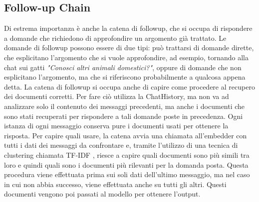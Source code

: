 \subsection{Follow-up Chain}
Di estrema importanza è anche la catena di followup, che si occupa di rispondere a domande che richiedono di approfondire un argomento già trattato. Le domande di followup possono essere di due tipi: può trattarsi di domande dirette, che esplicitano l'argomento che si vuole approfondire, ad esempio, tornando alla chat sui gatti \textit{"Conosci altri animali domestici?"}, oppure di domande che non esplicitano l'argomento, ma che si riferiscono probabilmente a qualcosa appena detta.
La catena di followup si occupa anche di capire come procedere al recupero dei documenti corretti. Per fare ciò utilizza la ChatHistory, ma non va ad analizzare solo il contenuto dei messaggi precedenti, ma anche i documenti che sono stati recuperati per rispondere a tali domande poste in precedenza. Ogni istanza di ogni messaggio conserva pure i documenti usati per ottenere la risposta. Per capire quali usare, la catena avvia una chiamata all'embedder con tutti i dati dei messaggi da confrontare e, tramite l'utilizzo di una tecnica di clustering chiamata TF-IDF \cite{li2024documenttypeclassificationusing}, riesce a capire quali documenti sono più simili tra loro e quindi quali sono i documenti più rilevanti per la domanda posta. Questa procedura viene effettuata prima sui soli dati dell'ultimo messaggio, ma nel caso in cui non abbia successo, viene effettuata anche su tutti gli altri. Questi documenti vengono poi passati al modello per ottenere l'output.

